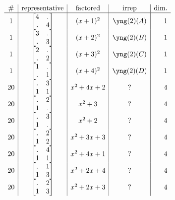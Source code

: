 \documentclass[11pt,oneside]{article}
\begin{document}
$$
\begin{array}{c|c|c|c|r}
\#    &             \text{representative}  &  \text{factored} & \text{irrep} & \text{dim.}  \\
\hline
1  &  \begin{bmatrix}4&.\\.&4\end{bmatrix}   & (x+1)^2  & \yng(2)(A) & 1  \\
1  &  \begin{bmatrix}3&.\\.&3\end{bmatrix}   & (x+2)^2  & \yng(2)(B) & 1  \\
1  &  \begin{bmatrix}2&.\\.&2\end{bmatrix}   & (x+3)^2  & \yng(2)(C) & 1  \\
1  &  \begin{bmatrix}1&.\\.&1\end{bmatrix}   & (x+4)^2  & \yng(2)(D) & 1  \\
20  &  \begin{bmatrix}.&3\\1&1\end{bmatrix}   & x^2+4x+2  & ? & 4  \\
20  &  \begin{bmatrix}.&2\\1&.\end{bmatrix}   & x^2+3     & ? & 4  \\
20  &  \begin{bmatrix}.&3\\1&.\end{bmatrix}   & x^2+2     & ? & 4  \\
20  &  \begin{bmatrix}.&2\\1&2\end{bmatrix}   & x^2+3x+3  & ? & 4  \\
20  &  \begin{bmatrix}.&4\\1&1\end{bmatrix}   & x^2+4x+1  & ? & 4  \\
20  &  \begin{bmatrix}.&1\\1&3\end{bmatrix}   & x^2+2x+4  & ? & 4  \\
20  &  \begin{bmatrix}.&2\\1&3\end{bmatrix}   & x^2+2x+3  & ? & 4  \\

\end{array}$$
\end{document}
